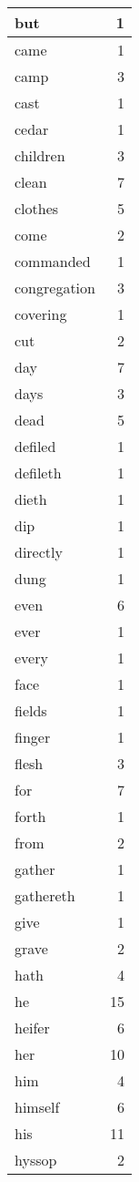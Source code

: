 \begin{center}
\begin{longtable}{l|r}
but & 1 \\ \hline
came & 1 \\ \hline
camp & 3 \\ \hline
cast & 1 \\ \hline
cedar & 1 \\ \hline
children & 3 \\ \hline
clean & 7 \\ \hline
clothes & 5 \\ \hline
come & 2 \\ \hline
commanded & 1 \\ \hline
congregation & 3 \\ \hline
covering & 1 \\ \hline
cut & 2 \\ \hline
day & 7 \\ \hline
days & 3 \\ \hline
dead & 5 \\ \hline
defiled & 1 \\ \hline
defileth & 1 \\ \hline
dieth & 1 \\ \hline
dip & 1 \\ \hline
directly & 1 \\ \hline
dung & 1 \\ \hline
even & 6 \\ \hline
ever & 1 \\ \hline
every & 1 \\ \hline
face & 1 \\ \hline
fields & 1 \\ \hline
finger & 1 \\ \hline
flesh & 3 \\ \hline
for & 7 \\ \hline
forth & 1 \\ \hline
from & 2 \\ \hline
gather & 1 \\ \hline
gathereth & 1 \\ \hline
give & 1 \\ \hline
grave & 2 \\ \hline
hath & 4 \\ \hline
he & 15 \\ \hline
heifer & 6 \\ \hline
her & 10 \\ \hline
him & 4 \\ \hline
himself & 6 \\ \hline
his & 11 \\ \hline
hyssop & 2 \\ \hline

\end{longtable}
\end{center}
